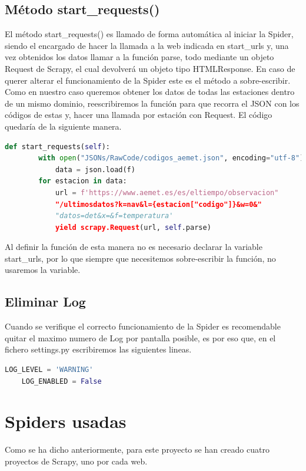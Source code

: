 \subsection{Método start\_requests()}
El método start\_requests() es llamado de forma automática al iniciar la Spider, siendo el encargado de hacer la llamada a la web indicada en start\_urls y, una vez obtenidos los datos llamar a la función parse, todo mediante un objeto Request de Scrapy, el cual devolverá un objeto tipo HTMLResponse. En caso de querer alterar el funcionamiento de la Spider este es el método a sobre-escribir.\newline
Como en nuestro caso queremos obtener los datos de todas las estaciones dentro de un mismo dominio, reescribiremos la función para que recorra el JSON con los códigos de estas y, hacer una llamada por estación con Request.
El código quedaría de la siguiente manera.

\begin{lstlisting}[language=Python, caption={Sobre-escritura de start\_request()}]
	def start_requests(self):
		with open("JSONs/RawCode/codigos_aemet.json", encoding="utf-8") as f:
			data = json.load(f)
		for estacion in data:
			url = f'https://www.aemet.es/es/eltiempo/observacion"
			"/ultimosdatos?k=nav&l={estacion["codigo"]}&w=0&"
			"datos=det&x=&f=temperatura'
			yield scrapy.Request(url, self.parse)
\end{lstlisting}

Al definir la función de esta manera no es necesario declarar la variable start\_urls, por lo que siempre que necesitemos sobre-escribir la función, no usaremos la variable.

\subsection{Eliminar Log}
Cuando se verifique el correcto funcionamiento de la Spider es recomendable quitar el maximo numero de Log por pantalla posible, es por eso que, en el fichero settings.py escribiremos las siguientes lineas.

\begin{lstlisting}[language=Python, caption={Configurar LOG}]
	LOG_LEVEL = 'WARNING'
	LOG_ENABLED = False
\end{lstlisting}

\section{Spiders usadas}
Como se ha dicho anteriormente, para este proyecto se han creado cuatro proyectos de Scrapy, uno por cada web.

